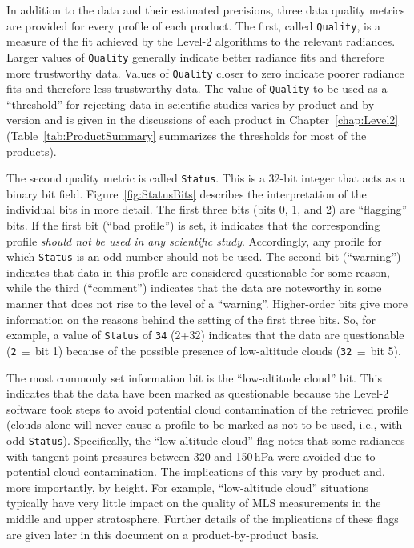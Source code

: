 

In addition to the data and their estimated precisions, three data quality metrics are provided for every profile of each product. The first, called \texttt{Quality}, is a measure of the fit achieved by the \mbox{Level-2} algorithms to the relevant radiances. Larger values of \texttt{Quality} generally indicate better radiance fits and therefore more trustworthy data. Values of \texttt{Quality} closer to zero indicate poorer radiance fits and therefore less trustworthy data. The value of \texttt{Quality} to be used as a ``threshold'' for rejecting data in scientific studies varies by product and by version and is given in the discussions of each product in Chapter~\ref{chap:Level2} (Table~\ref{tab:ProductSummary} summarizes the thresholds for most of the products).

The second quality metric is called \texttt{Status}. This is a 32-bit integer that acts as a binary bit field. Figure~\ref{fig:StatusBits} describes the interpretation of the individual bits in more detail. The first three bits (bits 0, 1, and 2) are ``flagging'' bits. If the first bit (``bad profile'') is set, it indicates that the corresponding profile \emph{should not be used in any scientific study}. Accordingly, any profile for which \texttt{Status} is an odd number should not be used. The second bit (``warning'') indicates that data in this profile are considered questionable for some reason, while the third (``comment'') indicates that the data are noteworthy in some manner that does not rise to the level of a ``warning''. Higher-order bits give more information on the reasons behind the setting of the first three bits. So, for example, a value of \texttt{Status} of \texttt{34} (2+32) indicates that the data are questionable (\texttt{2}\,$\equiv$\,bit 1) because of the possible presence of low-altitude clouds (\texttt{32}\,$\equiv$\,bit 5).

The most commonly set information bit is the ``low-altitude cloud'' bit. This indicates that the data have been marked as questionable because the \mbox{Level-2} software took steps to avoid potential cloud contamination of the retrieved profile (clouds alone will never cause a profile to be marked as not to be used, i.e., with odd \texttt{Status}). Specifically, the ``low-altitude cloud'' flag notes that some radiances with tangent point pressures between 320 and 150\,hPa were avoided due to potential cloud contamination. The implications of this vary by product and, more importantly, by height. For example, ``low-altitude cloud'' situations typically have very little impact on the quality of MLS measurements in the middle and upper stratosphere. Further details of the implications of these flags are given later in this document on a product-by-product basis.

